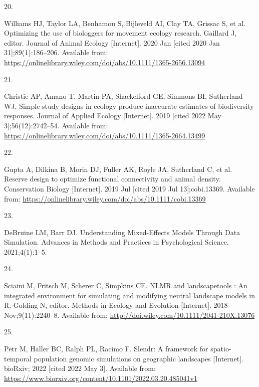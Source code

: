 \documentclass[10pt,a4paper]{article}
\newlength{\cslhangindent}
\newlength{\csllabelwidth}
\newlength{\cslentryspacingunit} %
\newenvironment{CSLReferences}[2] %
 {%
  \setlength{\parindent}{0pt}
  \ifodd #1
  \let\oldpar\par
  \def\par{\hangindent=\cslhangindent\oldpar}
  \fi
  \setlength{\parskip}{#2\cslentryspacingunit}
 }%
 {}
\newcommand{\CSLLeftMargin}[1]{\parbox[t]{\csllabelwidth}{#1}}
\newcommand{\CSLRightInline}[1]{\parbox[t]{\linewidth - \csllabelwidth}{#1}\break}
\begin{document}
\begin{CSLReferences}{0}{0}
\leavevmode{}%
\CSLLeftMargin{20. }
\CSLRightInline{Williams HJ, Taylor LA, Benhamou S, Bijleveld AI, Clay TA, Grissac S, et al. Optimizing the use of biologgers for movement ecology research. Gaillard J, editor. Journal of Animal Ecology {[}Internet{]}. 2020 Jan {[}cited 2020 Jan 31{]};89(1):186--206. Available from: \url{https://onlinelibrary.wiley.com/doi/abs/10.1111/1365-2656.13094}}

\leavevmode{}%
\CSLLeftMargin{21. }
\CSLRightInline{Christie AP, Amano T, Martin PA, Shackelford GE, Simmons BI, Sutherland WJ. Simple study designs in ecology produce inaccurate estimates of biodiversity responses. Journal of Applied Ecology {[}Internet{]}. 2019 {[}cited 2022 May 3{]};56(12):2742--54. Available from: \url{https://onlinelibrary.wiley.com/doi/abs/10.1111/1365-2664.13499}}

\leavevmode{}%
\CSLLeftMargin{22. }
\CSLRightInline{Gupta A, Dilkina B, Morin DJ, Fuller AK, Royle JA, Sutherland C, et al. Reserve design to optimize functional connectivity and animal density. Conservation Biology {[}Internet{]}. 2019 Jul {[}cited 2019 Jul 13{]};cobi.13369. Available from: \url{https://onlinelibrary.wiley.com/doi/abs/10.1111/cobi.13369}}

\leavevmode{}%
\CSLLeftMargin{23. }
\CSLRightInline{DeBruine LM, Barr DJ. Understanding {Mixed}-{Effects} {Models} {Through} {Data} {Simulation}. Advances in Methods and Practices in Psychological Science. 2021;4(1):1--5. }

\leavevmode{}%
\CSLLeftMargin{24. }
\CSLRightInline{Sciaini M, Fritsch M, Scherer C, Simpkins CE. {NLMR} and landscapetools : {An} integrated environment for simulating and modifying neutral landscape models in {R}. Golding N, editor. Methods in Ecology and Evolution {[}Internet{]}. 2018 Nov;9(11):2240--8. Available from: \url{http://doi.wiley.com/10.1111/2041-210X.13076}}

\leavevmode{}%
\CSLLeftMargin{25. }
\CSLRightInline{Petr M, Haller BC, Ralph PL, Racimo F. Slendr: A framework for spatio-temporal population genomic simulations on geographic landscapes {[}Internet{]}. bioRxiv; 2022 {[}cited 2022 May 3{]}. Available from: \url{https://www.biorxiv.org/content/10.1101/2022.03.20.485041v1}}


\end{CSLReferences}
\end{document}
